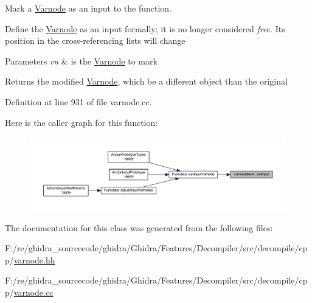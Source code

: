 Mark a \mbox{\hyperlink{class_varnode}{Varnode}} as an input to the function. 

Define the \mbox{\hyperlink{class_varnode}{Varnode}} as an input formally; it is no longer considered {\itshape free}. Its position in the cross-\/referencing lists will change 
\begin{DoxyParams}{Parameters}
{\em vn} & is the \mbox{\hyperlink{class_varnode}{Varnode}} to mark \\
\hline
\end{DoxyParams}
\begin{DoxyReturn}{Returns}
the modified \mbox{\hyperlink{class_varnode}{Varnode}}, which be a different object than the original 
\end{DoxyReturn}


Definition at line 931 of file varnode.\+cc.

Here is the caller graph for this function\+:
\nopagebreak
\begin{figure}[H]
\begin{center}
\leavevmode
\includegraphics[width=350pt]{class_varnode_bank_a132b64906ef393d34a4363ff816e4ba2_icgraph}
\end{center}
\end{figure}


The documentation for this class was generated from the following files\+:\begin{DoxyCompactItemize}
\item 
F\+:/re/ghidra\+\_\+sourcecode/ghidra/\+Ghidra/\+Features/\+Decompiler/src/decompile/cpp/\mbox{\hyperlink{varnode_8hh}{varnode.\+hh}}\item 
F\+:/re/ghidra\+\_\+sourcecode/ghidra/\+Ghidra/\+Features/\+Decompiler/src/decompile/cpp/\mbox{\hyperlink{varnode_8cc}{varnode.\+cc}}\end{DoxyCompactItemize}

